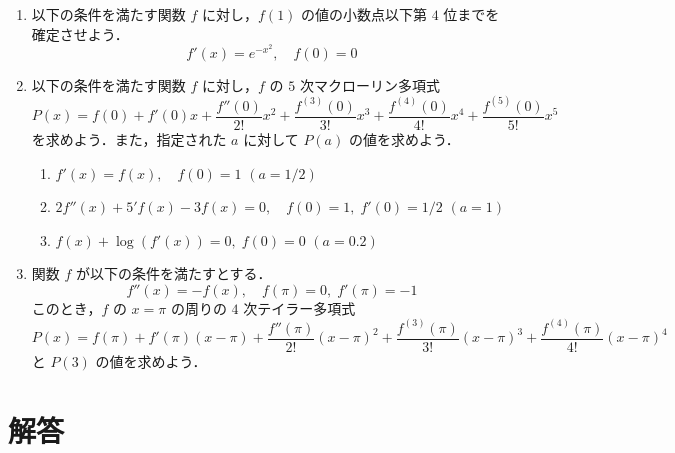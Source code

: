 \documentclass[11pt, uplatex, dvipdfmx, twoside]{jsarticle}
\newcommand{\ds}{\displaystyle}
\begin{document}
\begin{enumerate}[label=\arabic{section}.\arabic*]

\item 以下の条件を満たす関数 $f$ に対し，$f(1)$ の値の小数点以下第 $4$
  位までを確定させよう．
  \[
    f'(x) = e^{-x^2}, \quad f(0)=0
  \]

\item 以下の条件を満たす関数 $f$ に対し，$f$ の $5$ 次マクローリン多項式
  \[
    P(x) = f(0) + f'(0)x + \frac{f''(0)}{2!}x^2 +
    \frac{f^{(3)}(0)}{3!}x^3 + \frac{f^{(4)}(0)}{4!}x^4 + \frac{f^{(5)}(0)}{5!}x^5
  \]
  を求めよう．また，指定された $a$ に対して $P(a)$ の値を求めよう．
  
  \vspace{1ex}

  \begin{enumerate}[label=(\arabic*)]

    \setlength{\itemsep}{1ex}
    
  \item $f'(x) = f(x), \quad f(0) =1$ \quad $\ds (a=1/2)$

  \item $\ds 2f''(x) +5'f(x) -3 f(x)=0, \quad f(0)=1, \; f'(0)= 1/2$ \quad $(a=1)$

  \item $\ds f(x) + \log\left( f'(x)\right) =0, \; f(0)=0$ \quad $(a=0.2)$
    
  \end{enumerate}

\item 関数 $f$ が以下の条件を満たすとする．
  \[
    f''(x) = -f(x), \quad f(\pi)=0, \; f'(\pi) = -1
  \]
  このとき，$f$ の $x=\pi$ の周りの $4$ 次テイラー多項式
  \[
    P(x) = f(\pi) + f'(\pi) (x-\pi) + \frac{f''(\pi)}{2!}(x-\pi)^2 + \frac{f^{(3)}(\pi)}{3!}(x-\pi)^3
    + \frac{f^{(4)}(\pi)}{4!}(x-\pi)^4
  \]
  と $P(3)$ の値を求めよう．
    
\end{enumerate}


\newpage


\section*{解答}
\end{document}
